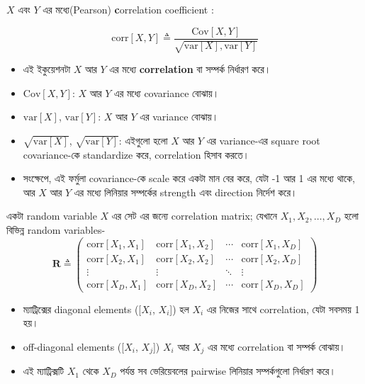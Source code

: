 \documentclass[graybox, envcountchap, twocolumn]{styles/svmult}
\begin{document}
\begin{definition}
{\bengalifont  $X$ এবং $Y$ এর মধ্যে(Pearson) {\textbf correlation coefficient} :}

\begin{equation}
\text{corr}[X,Y] \triangleq \dfrac{\text{Cov}[X,Y]}{\sqrt{\text{var}[X],\text{var}[Y]}}
\end{equation}


\begin{itemize}
    \item {\bengalifont এই ইকুয়েশনটা $X$ আর $Y$ এর মধ্যে {\bf correlation} বা সম্পর্ক নির্ধারণ করে।}
    \item $\text{Cov}[X, Y]$: {\bengalifont $X$ আর $Y$ এর মধ্যে covariance বোঝায়।}
    \item $\text{var}[X]$, $\text{var}[Y]$: {\bengalifont $X$ আর $Y$ এর variance  বোঝায়।}
    \item $\sqrt{\text{var}[X]}$, $\sqrt{\text{var}[Y]}$: {\bengalifont এইগুলো হলো $X$ আর $Y$ এর variance-এর square root covariance-কে standardize করে, correlation হিসাব করতে।}
    \item {\bengalifont সংক্ষেপে, এই ফর্মুলা covariance-কে scale করে একটা মান বের করে, যেটা -1 আর 1 এর মধ্যে থাকে, আর $X$ আর $Y$ এর মধ্যে লিনিয়ার সম্পর্কের strength এবং direction নির্দেশ করে।}
\end{itemize}

\end{definition}


{\bengalifont একটা random variable $X$ এর সেট এর জন্যে correlation matrix; যেখানে $X_1, X_2, \dots, X_D$ হলো বিভিন্ন random variables- }
\begin{equation}
\mathbf{R} \triangleq \left( \begin{array}{cccc}
           \text{corr}[X_1,X_1] & \text{corr}[X_1,X_2] & \cdots & \text{corr}[X_1,X_D] \\
           \text{corr}[X_2,X_1] & \text{corr}[X_2,X_2] & \cdots & \text{corr}[X_2,X_D] \\
		   \vdots & \vdots & \ddots & \vdots \\
           \text{corr}[X_D,X_1] & \text{corr}[X_D,X_2] & \cdots & \text{corr}[X_D,X_D] \end{array} \right)
\end{equation}



\begin{itemize}

\item {\bengalifont ম্যাট্রিক্সের diagonal elements ([$X_i$, $X_i$]) হল $X_i$ এর নিজের সাথে correlation, যেটা সবসময় 1 হয়।}
\item {\bengalifont off-diagonal elements ([$X_i$, $X_j$]) $X_i$ আর $X_j$ এর মধ্যে correlation বা সম্পর্ক বোঝায়।}
\item {\bengalifont এই ম্যাট্রিক্সটি $X_1$ থেকে $X_D$ পর্যন্ত সব ভেরিয়েবলের pairwise লিনিয়ার সম্পর্কগুলো নির্ধারণ করে।}
\end{itemize}
\end{document}
